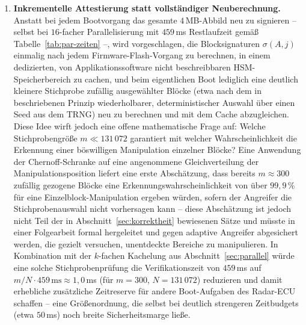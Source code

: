 ﻿\documentclass[a4paper,12pt]{article}
\theoremstyle{definition}
\begin{document}
\begin{enumerate}
	\item \textbf{Inkrementelle Attestierung statt vollständiger Neuberechnung.} Anstatt bei jedem Bootvorgang das gesamte $4$\,MB-Abbild neu zu signieren -- selbst bei $16$-facher Parallelisierung mit $459$\,ms Restlaufzeit gemäß Tabelle~\ref{tab:par-zeiten} --, wird vorgeschlagen, die Blocksignaturen $\sigma(A,j)$ einmalig nach jedem Firmware-Flash-Vorgang zu berechnen, in einem dedizierten, von Applikationssoftware nicht beschreibbaren HSM-Speicherbereich zu cachen, und beim eigentlichen Boot lediglich eine deutlich kleinere Stichprobe zufällig ausgewählter Blöcke (etwa nach dem in \cite{Epp26a} beschriebenen Prinzip wiederholbarer, deterministischer Auswahl über einen Seed aus dem TRNG) neu zu berechnen und mit dem Cache abzugleichen. Diese Idee wirft jedoch eine offene mathematische Frage auf: Welche Stichprobengröße $m \ll 131\,072$ garantiert mit welcher Wahrscheinlichkeit die Erkennung einer böswilligen Manipulation einzelner Blöcke? Eine Anwendung der Chernoff-Schranke auf eine angenommene Gleichverteilung der Manipulationsposition liefert eine erste Abschätzung, dass bereits $m \approx 300$ zufällig gezogene Blöcke eine Erkennungswahrscheinlichkeit von über $99{,}9\,\%$ für eine Einzelblock-Manipulation ergeben würden, sofern der Angreifer die Stichprobenauswahl nicht vorhersagen kann -- diese Abschätzung ist jedoch nicht Teil der in Abschnitt~\ref{sec:korrektheit} bewiesenen Sätze und müsste in einer Folgearbeit formal hergeleitet und gegen adaptive Angreifer abgesichert werden, die gezielt versuchen, unentdeckte Bereiche zu manipulieren. In Kombination mit der $k$-fachen Kachelung aus Abschnitt~\ref{sec:parallel} würde eine solche Stichprobenprüfung die Verifikationszeit von $459$\,ms auf $m/N \cdot 459\,\mathrm{ms} \approx 1{,}0$\,ms (für $m=300$, $N=131\,072$) reduzieren und damit erhebliche zusätzliche Zeitreserve für andere Boot-Aufgaben des Radar-ECU schaffen -- eine Größenordnung, die selbst bei deutlich strengeren Zeitbudgets (etwa $50$\,ms) noch breite Sicherheitsmarge ließe.

\end{enumerate}
\end{document}
